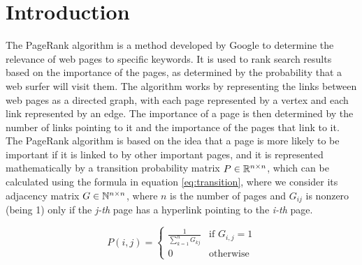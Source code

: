 \section{Introduction}


The PageRank algorithm is a method developed by Google to determine the relevance of web pages to specific keywords. It is used to rank search results based on the importance of the pages, as determined by the probability that a web surfer will visit them. The algorithm works by representing the links between web pages as a directed graph, with each page represented by a vertex and each link represented by an edge. The importance of a page is then determined by the number of links pointing to it and the importance of the pages that link to it. The PageRank algorithm is based on the idea that a page is more likely to be important if it is linked to by other important pages, and it is represented mathematically by a transition probability matrix $P \in \mathbb{R}^{n \times n}$, which can be calculated using the formula in equation \ref{eq:transition}, where we consider its adjacency matrix $G \in \mathbb{N}^{n \times n}$, where $n$ is the number of pages and $G_{ij}$ is nonzero (being 1) only if the \emph{j-th} page has a hyperlink pointing to the \emph{i-th} page.

\begin{equation}\label{eq:transition}
    P(i,j) =
    \begin{cases}
        \displaystyle \frac{1}{\sum_{k=1}^n G_{kj}} & \text{if } G_{i,j} = 1 \\
        0 & \text{otherwise}
    \end{cases}
\end{equation}

